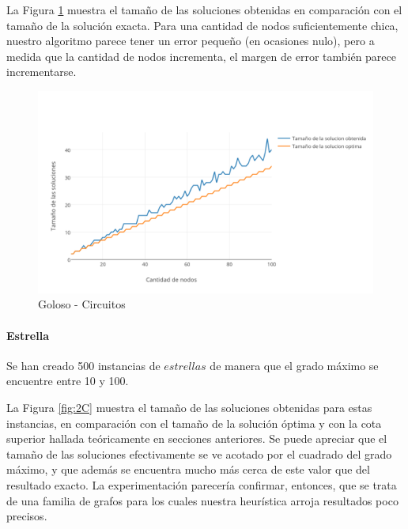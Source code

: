 La Figura \ref{fig:2B} muestra el tamaño de las soluciones obtenidas en comparación con el tamaño de la solución exacta. Para una cantidad de nodos suficientemente chica, nuestro algoritmo parece tener un error pequeño (en ocasiones nulo), pero a medida que la cantidad de nodos incrementa, el margen de error también parece incrementarse.

\begin{figure}[htb]
	\begin{center}
    		\includegraphics[scale=0.8]{imagenes/goloso-circuito.png}
	\end{center}
	\caption{Goloso - Circuitos \label{fig:2B}}
\end{figure}

\paragraph{Estrella} Se han creado 500 instancias de $estrellas$ de manera que el grado máximo se encuentre entre 10 y 100.

La Figura \ref{fig:2C} muestra el tamaño de las soluciones obtenidas para estas instancias, en comparación con el tamaño de la solución óptima y con la cota superior hallada teóricamente en secciones anteriores. Se puede apreciar que el tamaño de las soluciones efectivamente se ve acotado por el cuadrado del grado máximo, y que además se encuentra mucho más cerca de este valor que del resultado exacto. La experimentación parecería confirmar, entonces, que se trata de una familia de grafos para los cuales nuestra heurística arroja resultados poco precisos.


